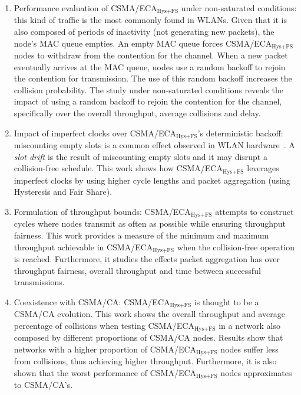 \documentclass[]{article}
\begin{document}
\begin{enumerate}
	\item Performance evaluation of CSMA/ECA$_{\text{Hys+FS}}$ under non-saturated conditions: this kind of traffic is the most commonly found in WLANs. Given that it is also composed of periods of inactivity (not generating new packets), the node's MAC queue empties. An empty MAC queue forces CSMA/ECA$_{\text{Hys+FS}}$ nodes to withdraw from the contention for the channel. When a new packet eventually arrives at the MAC queue, nodes use a random backoff to rejoin the contention for transmission. The use of this random backoff increases the collision probability. The study under non-saturated conditions reveals the impact of using a random backoff to rejoin the contention for the channel, specifically over the overall throughput, average collisions and delay.
	
	\item Impact of imperfect clocks over CSMA/ECA$_{\text{Hys+FS}}$'s deterministic backoff: miscounting empty slots is a common effect observed in WLAN hardware~\cite{slotDrift}. A \emph{slot drift} is the result of miscounting empty slots and it may disrupt a collision-free schedule. This work shows how CSMA/ECA$_{\text{Hys+FS}}$ leverages imperfect clocks by using higher cycle lengths and packet aggregation (using Hysteresis and Fair Share).
	
	\item Formulation of throughput bounds: CSMA/ECA$_{\text{Hys+FS}}$ attempts to construct cycles where nodes transmit as often as possible while ensuring throughput fairness. This work provides a measure of the minimum and maximum throughput achievable in CSMA/ECA$_{\text{Hys+FS}}$ when the collision-free operation is reached. Furthermore, it studies the effects packet aggregation has over throughput fairness, overall throughput and time between successful transmissions.
	
	\item Coexistence with CSMA/CA: CSMA/ECA$_{\text{Hys+FS}}$ is thought to be a CSMA/CA evolution. This work shows the overall throughput and average percentage of collisions when testing CSMA/ECA$_{\text{Hys+FS}}$ in a network also composed by different proportions of CSMA/CA nodes. Results show that networks with a higher proportion of CSMA/ECA$_{\text{Hys+FS}}$ nodes suffer less from collisions, thus achieving higher throughput. Furthermore, it is also shown that the worst performance of CSMA/ECA$_{\text{Hys+FS}}$ nodes approximates to CSMA/CA's.
\end{enumerate}



\end{document}
